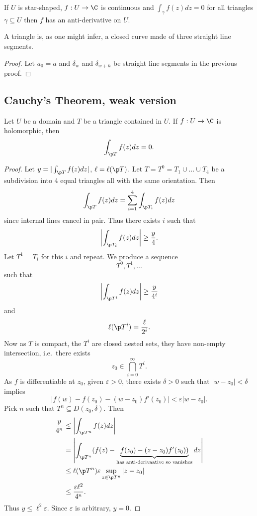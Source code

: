 \documentclass[a4paper]{article}
\begin{document}
\begin{corollary}\label{cor:anti-derivative}
  If \(U\) is star-shaped, \(f: U \to \C\) is continuous and \(\int_\gamma f(z)dz = 0\) for all triangles \(\gamma \subseteq U\) then \(f\) has an anti-derivative on \(U\).
\end{corollary}

A triangle is, as one might infer, a closed curve made of three straight line segments.

\begin{proof}
  Let \(a_0 = a\) and \(\delta_w\) and \(\delta_{w + h}\) be straight line segments in the previous proof.
\end{proof}

\subsection{Cauchy's Theorem, weak version}

\begin{theorem}
  Let \(U\) be a domain and \(T\) be a triangle contained in \(U\). If \(f: U \to \C\) is holomorphic, then
  \[
    \int_{\p T} f(z)dz = 0.
  \]
\end{theorem}

\begin{proof}
  Let \(y = |\int_{\p T} f(z)dz|\), \(\ell = \ell(\p T)\). Let \(T = T^0 = T_1 \cup \dots \cup T_4\) be a subdivision into 4 equal triangles all with the same orientation. Then
  \[
    \int_{\p T} f(z)dz = \sum_{i = 1}^4 \int_{\p T_i} f(z)dz
  \]
  since internal lines cancel in pair. Thus there exists \(i\) such that
  \[
    \left| \int_{\p T_i} f(z)dz \right| \geq \frac{y}{4}.
  \]
  Let \(T^1 = T_i\) for this \(i\) and repeat. We produce a sequence
  \[
    T^0, T^1, \dots
  \]
  such that
  \[
    \left| \int_{\p T^i} f(z)dz \right| \geq \frac{y}{4^i}
  \]
  and
  \[
    \ell(\p T^i) = \frac{\ell}{2^i}.
  \]
  Now as \(T\) is compact, the \(T^i\) are closed nested sets, they have non-empty intersection, i.e.\ there exists
  \[
    z_0 \in \bigcap_{i = 0}^\infty T^i.
  \]
  As \(f\) is differentiable at \(z_0\), given \(\varepsilon > 0\), there exists \(\delta > 0\) such that \(|w - z_0| < \delta\) implies
  \[
    |f(w) - f(z_0) - (w - z_0) f'(z_0)| < \varepsilon |w - z_0|.
  \]
  Pick \(n\) such that \(T^n \subseteq D(z_0, \delta)\). Then
  \begin{align*}
    \frac{y}{4^n} &\leq \left| \int_{\p T^n} f(z)dz \right| \\
                  &= \left| \int_{\p T^n} (f(z) - \underbrace{f(z_0) - (z - z_0)f'(z_0))}_{\text{has anti-derivaative so vanishes}} dz \right| \\
                  &\leq \ell(\p T^n) \varepsilon \sup_{z \in \p T^n} |z - z_0| \\
                  &\leq \frac{\varepsilon \ell^2}{4^n}.
  \end{align*}
  Thus \(y \leq \ell^2 \varepsilon\). Since \(\varepsilon\) is arbitrary, \(y = 0\).
\end{proof}
\end{document}
